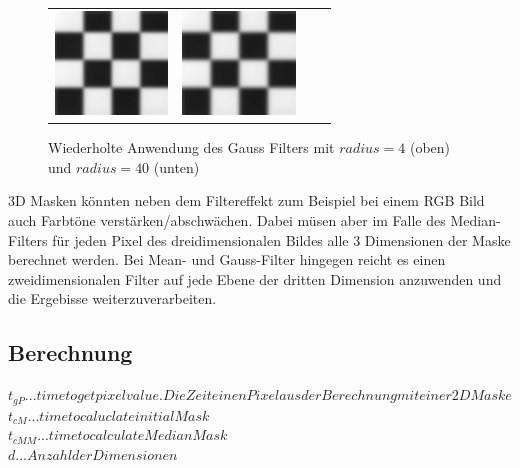 \documentclass[12pt,german]{article}
\begin{document}
\begin{figure} [H]
\begin{tabular}{| c | c | c | c |}
	\includegraphics[width=3cm]{../testData/Gauss/SchachbrettR40S4v3.jpg} & 	
	\includegraphics[width=3cm]{../testData/Gauss/SchachbrettR40S4v4.jpg} \\
  \end{tabular}
  \caption{Wiederholte Anwendung des Gauss Filters mit $ radius = 4 $ (oben) und $radius = 40 $ (unten)}
  \label{tab:wiederholterGauss}

\end{figure}
3D Masken könnten neben dem Filtereffekt zum Beispiel bei einem RGB Bild auch Farbtöne verstärken/abschwächen. Dabei müsen aber im Falle des Median-Filters für jeden Pixel des dreidimensionalen Bildes alle 3 Dimensionen der Maske berechnet werden. Bei Mean- und Gauss-Filter hingegen reicht es einen zweidimensionalen Filter auf jede Ebene der dritten Dimension anzuwenden und die Ergebisse weiterzuverarbeiten. 


\subsection{Berechnung}

\begin{center}
	$t_{gP} ... time to get pixel value. Die Zeit einen Pixel aus der Berechnung mit einer 2D Maske  $ \\
	$t_{cM} ... time to caluclate initial Mask$ \\
	$t_{cMM} ... time to calculate MedianMask $ \\
	$d ... Anzahl der Dimensionen$ \\
\end{center}
\end{document}
